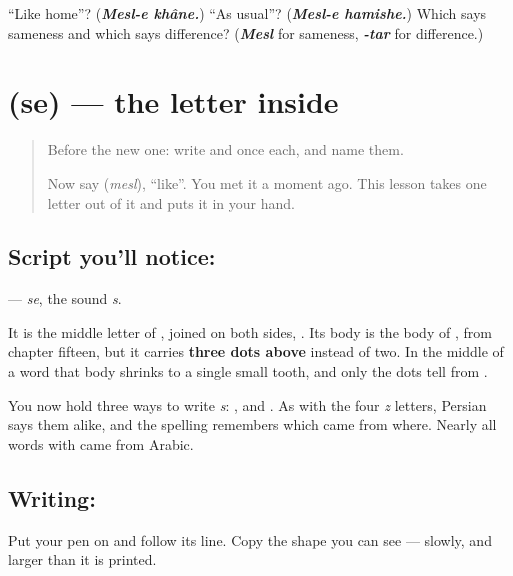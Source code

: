 \begin{tcolorbox}[breakable,colback=teal!4,colframe=teal!35!black,title={Before you move on}]
\textquotedblleft{}Like home\textquotedblright{}? (\emph{\textbf{Mesl-e khâne.}}) \textquotedblleft{}As usual\textquotedblright{}? (\emph{\textbf{Mesl-e hamishe.}}) Which says sameness and which says difference? (\emph{\textbf{Mesl}} for sameness, \emph{\textbf{-tar}} for difference.)
\end{tcolorbox}
\section[\texorpdfstring{\fa{ث} (se)}{ث (se)}]{ (se) — the letter inside }

\label{lesson:FA-W297-se}



\begin{quote}
Before the new one: write  and  once each, and name them.

Now say \textbf{} (\emph{mesl}), \textquotedblleft{}like\textquotedblright{}. You met it a moment ago. This lesson takes one letter out of it and puts it in your hand.
\end{quote}

\subsection*{Script you'll notice: }
\textbf{} — \emph{se}, the sound \emph{s}.

It is the middle letter of \textbf{}, joined on both sides, \textbf{}. Its body is the body of \textbf{}, from chapter fifteen, but it carries \textbf{three dots above} instead of two. In the middle of a word that body shrinks to a single small tooth, and only the dots tell \textbf{} from \textbf{}.

You now hold three ways to write \emph{s}: \textbf{}, \textbf{} and \textbf{}. As with the four \emph{z} letters, Persian says them alike, and the spelling remembers which came from where. Nearly all words with \textbf{} came from Arabic.

\subsection*{Writing: }
Put your pen on  and follow its line. Copy the shape you can see — slowly, and larger than it is printed.

